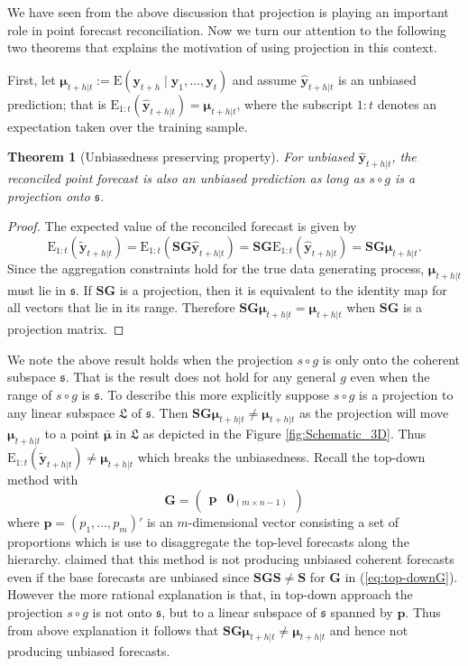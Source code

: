 \documentclass[12pt]{article}
\def\E{\text{E}}
\newtheorem{theo}{Theorem}[section]
\theoremstyle{definition}
\begin{document}
	We have seen from the above discussion that projection is playing an important role in point forecast reconciliation. Now we turn our attention to the following two theorems that explains the motivation of using projection in this context. 
	
	First, let $\bm{\mu}_{t+h|t}:=\E(\bm{y}_{t+h}\mid\bm{y}_{1},\dots,\bm{y}_{t})$ and assume $\hat{\bm{y}}_{t+h|t}$ is an unbiased prediction; that is $\E_{1:t}(\hat{\bm{y}}_{t+h|t})=\bm{\mu}_{t+h|t}$, where the subscript $1:t$ denotes an expectation taken over the training sample.
	
	\begin{theo}[Unbiasedness preserving property]
		For unbiased $\hat{\bm{y}}_{t+h|t}$, the reconciled point forecast is also an unbiased prediction as long as $s\circ g$ is a projection onto $\mathfrak{s}$.
	\end{theo}
	\begin{proof}
		The expected value of the reconciled forecast is given by
		\[
		\E_{1:t}(\tilde{\bm{y}}_{t+h|t})
		= \E_{1:t}(\bm{S}\bm{G}\hat{\bm{y}}_{t+h|t})
		= \bm{S}\bm{G}\E_{1:t}(\hat{\bm{y}}_{t+h|t})
		= \bm{S}\bm{G}\bm{\mu}_{t+h|t}.
		\]
		Since the aggregation constraints hold for the true data generating process, $\bm{\mu}_{t+h|t}$ must lie in $\mathfrak{s}$. If $\bm{S}\bm{G}$ is a projection, then it is equivalent to the identity map for all vectors that lie in its range. Therefore $\bm{S}\bm{G}\bm{\mu}_{t+h|t}=\bm{\mu}_{t+h|t}$ when $\bm{S}\bm{G}$ is a projection matrix.
	\end{proof}

	We note the above result holds when the projection $s\circ g$ is only onto the coherent subspace $\mathfrak{s}$. That is the result does not hold for any general $g$ even when the range of $s\circ g$ is $\mathfrak{s}$. To describe this more explicitly suppose $s\circ g$ is a projection to any linear subspace $\mathfrak{L}$ of $\mathfrak{s}$. Then $\bm{S}\bm{G}\bm{\mu}_{t+h|t} \ne \bm{\mu}_{t+h|t}$ as the projection will move $\bm{\mu}_{t+h|t}$ to a point $\bar{\bm{\mu}}$ in $\mathfrak{L}$ as depicted in the Figure \ref{fig:Schematic_3D}. Thus $\E_{1:t}(\tilde{\bm{y}}_{t+h|t}) \ne \bm{\mu}_{t+h|t}$ which breaks the unbiasedness. Recall the top-down method \citep{Gross1990} with 
	\begin{equation}\label{eq:top-downG}
	\bm{G}=\begin{pmatrix}
	\bm{p} & \bm{0}_{(m \times n-1)}
	\end{pmatrix}
	\end{equation}
    where $\bm{p} = (p_1,\dots,p_m)'$ is an $m$-dimensional vector consisting a set of proportions which is use to disaggregate the top-level forecasts along the hierarchy. \cite{Hyndman2011} claimed that this method is not producing unbiased coherent forecasts even if the base forecasts are unbiased since $\bm{SGS} \ne \bm{S}$ for $\bm{G}$ in (\ref{eq:top-downG}). However the more rational explanation is that, in top-down approach the projection $s\circ g$ is not onto $\mathfrak{s}$, but to a linear subspace of $\mathfrak{s}$ spanned by $\bm{p}$. Thus from above explanation it follows that  $\bm{S}\bm{G}\bm{\mu}_{t+h|t} \ne \bm{\mu}_{t+h|t}$ and hence not producing unbiased forecasts. 
	
\end{document}
